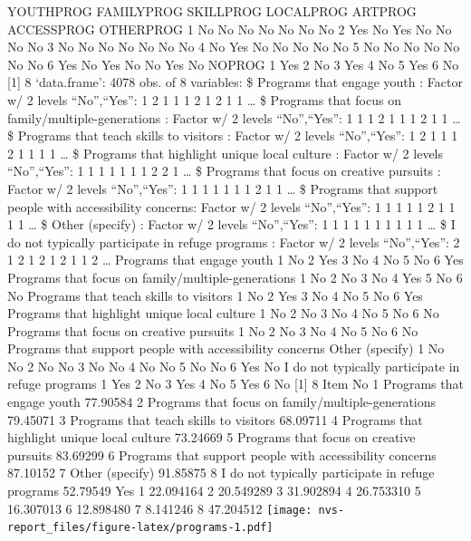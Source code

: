 \documentclass[]{book}
\begin{document}
YOUTHPROG FAMILYPROG SKILLPROG LOCALPROG ARTPROG ACCESSPROG OTHERPROG 1
No No No No No No No 2 Yes No Yes No No No No 3 No No No No No No No 4
No Yes No No No No No 5 No No No No No No No 6 Yes No Yes No No Yes No
NOPROG 1 Yes 2 No 3 Yes 4 No 5 Yes 6 No {[}1{]} 8 `data.frame': 4078
obs. of 8 variables: \$ Programs that engage youth : Factor w/ 2 levels
``No'',``Yes'': 1 2 1 1 1 2 1 2 1 1 \ldots{} \$ Programs that focus on
family/multiple-generations : Factor w/ 2 levels ``No'',``Yes'': 1 1 1 2
1 1 1 2 1 1 \ldots{} \$ Programs that teach skills to visitors : Factor
w/ 2 levels ``No'',``Yes'': 1 2 1 1 1 2 1 1 1 1 \ldots{} \$ Programs
that highlight unique local culture : Factor w/ 2 levels ``No'',``Yes'':
1 1 1 1 1 1 1 2 2 1 \ldots{} \$ Programs that focus on creative pursuits
: Factor w/ 2 levels ``No'',``Yes'': 1 1 1 1 1 1 1 2 1 1 \ldots{} \$
Programs that support people with accessibility concerns: Factor w/ 2
levels ``No'',``Yes'': 1 1 1 1 1 2 1 1 1 1 \ldots{} \$ Other (specify) :
Factor w/ 2 levels ``No'',``Yes'': 1 1 1 1 1 1 1 1 1 1 \ldots{} \$ I do
not typically participate in refuge programs : Factor w/ 2 levels
``No'',``Yes'': 2 1 2 1 2 1 2 1 1 2 \ldots{} Programs that engage youth
1 No 2 Yes 3 No 4 No 5 No 6 Yes Programs that focus on
family/multiple-generations 1 No 2 No 3 No 4 Yes 5 No 6 No Programs that
teach skills to visitors 1 No 2 Yes 3 No 4 No 5 No 6 Yes Programs that
highlight unique local culture 1 No 2 No 3 No 4 No 5 No 6 No Programs
that focus on creative pursuits 1 No 2 No 3 No 4 No 5 No 6 No Programs
that support people with accessibility concerns Other (specify) 1 No No
2 No No 3 No No 4 No No 5 No No 6 Yes No I do not typically participate
in refuge programs 1 Yes 2 No 3 Yes 4 No 5 Yes 6 No {[}1{]} 8 Item No 1
Programs that engage youth 77.90584 2 Programs that focus on
family/multiple-generations 79.45071 3 Programs that teach skills to
visitors 68.09711 4 Programs that highlight unique local culture
73.24669 5 Programs that focus on creative pursuits 83.69299 6 Programs
that support people with accessibility concerns 87.10152 7 Other
(specify) 91.85875 8 I do not typically participate in refuge programs
52.79549 Yes 1 22.094164 2 20.549289 3 31.902894 4 26.753310 5 16.307013
6 12.898480 7 8.141246 8 47.204512
\texttt{[image: nvs-report\_files/figure-latex/programs-1.pdf]}
\end{document}
